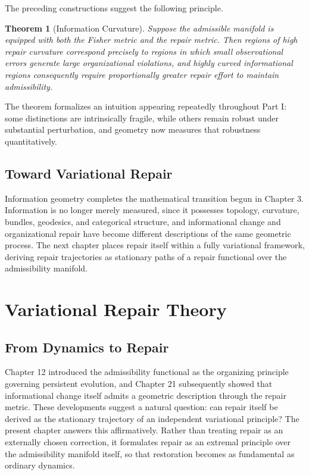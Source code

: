 \documentclass[11pt,oneside]{book}
\numberwithin{equation}{chapter}
\theoremstyle{definition}
\theoremstyle{plain}
\newtheorem{theorem}[definition]{Theorem}
\begin{document}
The preceding constructions suggest the following principle.

\begin{theorem}[Information Curvature]

Suppose the admissible manifold is equipped with both the Fisher metric and the repair metric. Then regions of high repair curvature correspond precisely to regions in which small observational errors generate large organizational violations, and highly curved informational regions consequently require proportionally greater repair effort to maintain admissibility.

\end{theorem}

The theorem formalizes an intuition appearing repeatedly throughout Part I: some distinctions are intrinsically fragile, while others remain robust under substantial perturbation, and geometry now measures that robustness quantitatively.

\section{Toward Variational Repair}

Information geometry completes the mathematical transition begun in Chapter 3. Information is no longer merely measured, since it possesses topology, curvature, bundles, geodesics, and categorical structure, and informational change and organizational repair have become different descriptions of the same geometric process. The next chapter places repair itself within a fully variational framework, deriving repair trajectories as stationary paths of a repair functional over the admissibility manifold.

\chapter{Variational Repair Theory}

\section{From Dynamics to Repair}

Chapter 12 introduced the admissibility functional as the organizing principle governing persistent evolution, and Chapter 21 subsequently showed that informational change itself admits a geometric description through the repair metric. These developments suggest a natural question: can repair itself be derived as the stationary trajectory of an independent variational principle? The present chapter answers this affirmatively. Rather than treating repair as an externally chosen correction, it formulates repair as an extremal principle over the admissibility manifold itself, so that restoration becomes as fundamental as ordinary dynamics.
\end{document}
